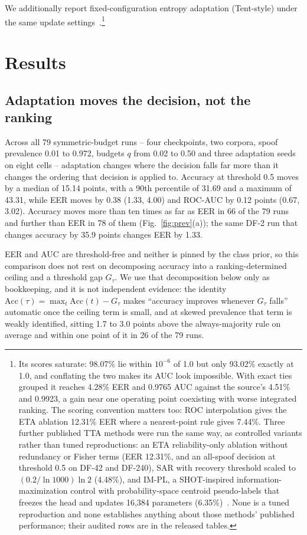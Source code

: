 \documentclass[10pt,letterpaper]{article}
\begin{document}
We additionally report fixed-configuration entropy adaptation (Tent-style)
under the same update settings~\cite{tent}.\footnote{Its scores saturate:
98.07\% lie within $10^{-6}$ of 1.0 but only 93.02\% exactly at 1.0, and
conflating the two makes its AUC look impossible. With exact ties grouped it
reaches 4.28\% EER and 0.9765 AUC against the source's 4.51\% and 0.9923, a
gain near one operating point coexisting with worse integrated ranking. The
scoring convention matters too: ROC interpolation gives the ETA ablation
12.31\% EER where a nearest-point rule gives 7.44\%. Three further published
TTA methods were run the same way, as controlled variants rather than tuned
reproductions: an ETA reliability-only ablation without redundancy or Fisher
terms (EER 12.31\%, and an all-spoof decision at threshold 0.5 on DF-42 and
DF-240), SAR with recovery threshold scaled to $(0.2/\ln1000)\ln2$ (4.48\%),
and IM-PL, a SHOT-inspired information-maximization control with
probability-space centroid pseudo-labels that freezes the head and updates
16,384 parameters (6.35\%)~\cite{eata,sar,shot}. None is a tuned reproduction
and none establishes anything about those methods' published performance;
their audited rows are in the released tables.}

\section{Results}
\label{sec:results}
\subsection{Adaptation moves the decision, not the ranking}
Across all 79 symmetric-budget runs -- four checkpoints, two corpora, spoof
prevalence 0.01 to 0.972, budgets $q$ from 0.02 to 0.50 and three adaptation
seeds on eight cells -- adaptation changes where the decision falls far more
than it changes the ordering that decision is applied to. Accuracy at threshold
0.5 moves by a median of 15.14 points, with a 90th percentile of 31.69 and a
maximum of 43.31, while EER moves by 0.38 (1.33, 4.00) and ROC-AUC by 0.12
points (0.67, 3.02). Accuracy moves more than ten times as far as EER in 66 of
the 79 runs and further than EER in 78 of them (Fig.~\ref{fig:prev}(a)); the
same DF-2 run that changes accuracy by 35.9 points changes EER by 1.33.

EER and AUC are threshold-free and neither is pinned by the class prior, so
this comparison does not rest on decomposing accuracy into a
ranking-determined ceiling and a threshold gap $G_\tau$. We use that
decomposition below only as bookkeeping, and it is not independent evidence:
the identity $\mathrm{Acc}(\tau)=\max_t\mathrm{Acc}(t)-G_\tau$ makes
``accuracy improves whenever $G_\tau$ falls'' automatic once the ceiling term
is small, and at skewed prevalence that term is weakly identified, sitting
1.7 to 3.0 points above the always-majority rule on average and within one
point of it in 26 of the 79 runs.
\end{document}
